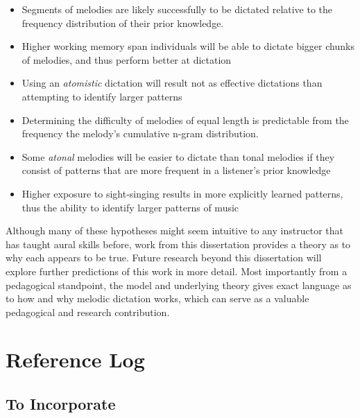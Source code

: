 \documentclass[]{book}
\providecommand{\tightlist}{%
  \setlength{\itemsep}{0pt}\setlength{\parskip}{0pt}}
\begin{document}
\begin{itemize}
\tightlist
\item
  Segments of melodies are likely successfully to be dictated relative to the frequency distribution of their prior knowledge.
\item
  Higher working memory span individuals will be able to dictate bigger chunks of melodies, and thus perform better at dictation
\item
  Using an \emph{atomistic} dictation will result not as effective dictations than attempting to identify larger patterns
\item
  Determining the difficulty of melodies of equal length is predictable from the frequency the melody's cumulative n-gram distribution.
\item
  Some \emph{atonal} melodies will be easier to dictate than tonal melodies if they consist of patterns that are more frequent in a listener's prior knowledge
\item
  Higher exposure to sight-singing results in more explicitly learned patterns, thus the ability to identify larger patterns of music
\end{itemize}

Although many of these hypotheses might seem intuitive to any instructor that has taught aural skills before, work from this dissertation provides a theory as to why each appears to be true.
Future research beyond this dissertation will explore further predictions of this work in more detail.
Most importantly from a pedagogical standpoint, the model and underlying theory gives exact language as to how and why melodic dictation works, which can serve as a valuable pedagogical and research contribution.

\hypertarget{reference-log}{%
\chapter{Reference Log}\label{reference-log}}

\hypertarget{to-incorporate}{%
\section{To Incorporate}\label{to-incorporate}}
\end{document}
